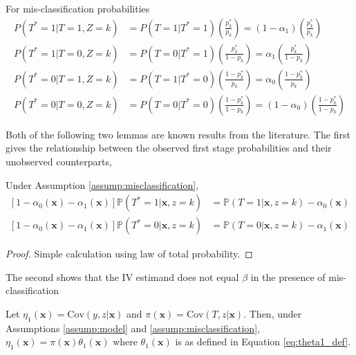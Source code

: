 \documentclass[12pt]{article}
\begin{document}
\begin{lem}
For mis-classification probabilities
\begin{align*}
  P(T^*=1|T=1, Z=k) &= P(T=1 | T^*=1) \left(\frac{p_k^*}{p_k}\right) = (1 - \alpha_1)\left( \frac{p_k^*}{p_k} \right)\\
  P(T^*=1|T=0, Z=k) &= P(T=0 | T^*=1) \left(\frac{p_k^*}{1 - p_k}\right) = \alpha_1 \left( \frac{p_k^*}{1 - p_k} \right)\\
  P(T^*=0|T=1, Z=k) &= P(T=1 | T^*=0) \left(\frac{1 - p_k^*}{p_k}\right) = \alpha_0 \left( \frac{1 - p_k^*}{p_k} \right)\\
  P(T^*=0|T=0, Z=k) &= P(T=0 | T^*=0) \left(\frac{1 - p_k^*}{1 - p_k}\right) = (1 - \alpha_0)\left( \frac{1 - p_k^*}{1 - p_k} \right)
\end{align*}
\end{lem}


\noindent Both of the following two lemmas are known results from the literature.
The first gives the relationship between the observed first stage probabilities and their unobserved counterparts,
\begin{lem}
  Under Assumption \ref{assump:misclassification}, 
\begin{align*}
  \left[ 1 - \alpha_0(\mathbf{x}) - \alpha_1(\mathbf{x}) \right]\mathbb{P}(T^*=1|\mathbf{x}, z=k) &= \mathbb{P}(T=1|\mathbf{x},z=k) - \alpha_0(\mathbf{x})\\
  \left[ 1 - \alpha_0(\mathbf{x}) - \alpha_1(\mathbf{x}) \right]\mathbb{P}(T^*=0|\mathbf{x}, z=k) &= \mathbb{P}(T=0|\mathbf{x},z=k) - \alpha_1(\mathbf{x})
\end{align*}
\label{lem:p_pstar}
\end{lem} 

\begin{proof}
  Simple calculation using law of total probability.
\end{proof}

\noindent The second shows that the IV estimand does not equal $\beta$ in the presence of mis-classification
\begin{lem}
  Let $\eta_1(\mathbf{x}) = \mbox{Cov}(y,z|\mathbf{x})$ and $\pi(\mathbf{x}) = \mbox{Cov}(T,z|\mathbf{x})$.  
  Then, under Assumptions \ref{assump:model} and \ref{assump:misclassification}, $\eta_1(\mathbf{x}) = \pi(\mathbf{x}) \theta_1(\mathbf{x})$ where $\theta_1(\mathbf{x})$ is as defined in Equation \ref{eq:theta1_def}.
  \label{lem:eta1}
\end{lem}
\end{document}
